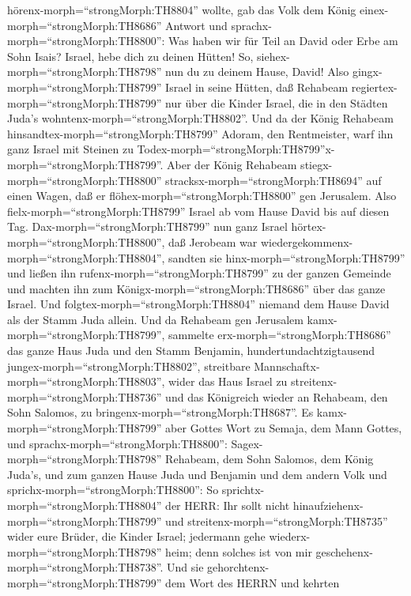 hörenx-morph=``strongMorph:TH8804'' wollte, gab das Volk dem König
einex-morph=``strongMorph:TH8686'' Antwort und
sprachx-morph=``strongMorph:TH8800'': Was haben wir für Teil an David
oder Erbe am Sohn Isais? Israel, hebe dich zu deinen Hütten! So,
siehex-morph=``strongMorph:TH8798'' nun du zu deinem Hause, David! Also
gingx-morph=``strongMorph:TH8799'' Israel in seine Hütten, 
daß Rehabeam regiertex-morph=``strongMorph:TH8799'' nur über die Kinder
Israel, die in den Städten Juda's wohntenx-morph=``strongMorph:TH8802''.
 Und da der König Rehabeam
hinsandtex-morph=``strongMorph:TH8799'' Adoram, den Rentmeister, warf
ihn ganz Israel mit Steinen zu
Todex-morph=``strongMorph:TH8799''x-morph=``strongMorph:TH8799''. Aber
der König Rehabeam stiegx-morph=``strongMorph:TH8800''
stracksx-morph=``strongMorph:TH8694'' auf einen Wagen, daß er
flöhex-morph=``strongMorph:TH8800'' gen Jerusalem.  Also
fielx-morph=``strongMorph:TH8799'' Israel ab vom Hause David bis auf
diesen Tag.  Dax-morph=``strongMorph:TH8799'' nun ganz
Israel hörtex-morph=``strongMorph:TH8800'', daß Jerobeam war
wiedergekommenx-morph=``strongMorph:TH8804'', sandten sie
hinx-morph=``strongMorph:TH8799'' und ließen ihn
rufenx-morph=``strongMorph:TH8799'' zu der ganzen Gemeinde und machten
ihn zum Königx-morph=``strongMorph:TH8686'' über das ganze Israel. Und
folgtex-morph=``strongMorph:TH8804'' niemand dem Hause David als der
Stamm Juda allein.  Und da Rehabeam gen Jerusalem
kamx-morph=``strongMorph:TH8799'', sammelte
erx-morph=``strongMorph:TH8686'' das ganze Haus Juda und den Stamm
Benjamin, hundertundachtzigtausend jungex-morph=``strongMorph:TH8802'',
streitbare Mannschaftx-morph=``strongMorph:TH8803'', wider das Haus
Israel zu streitenx-morph=``strongMorph:TH8736'' und das Königreich
wieder an Rehabeam, den Sohn Salomos, zu
bringenx-morph=``strongMorph:TH8687''.  Es
kamx-morph=``strongMorph:TH8799'' aber Gottes Wort zu Semaja, dem Mann
Gottes, und sprachx-morph=``strongMorph:TH8800'': 
Sagex-morph=``strongMorph:TH8798'' Rehabeam, dem Sohn Salomos, dem König
Juda's, und zum ganzen Hause Juda und Benjamin und dem andern Volk und
sprichx-morph=``strongMorph:TH8800'':  So
sprichtx-morph=``strongMorph:TH8804'' der HERR: Ihr sollt nicht
hinaufziehenx-morph=``strongMorph:TH8799'' und
streitenx-morph=``strongMorph:TH8735'' wider eure Brüder, die Kinder
Israel; jedermann gehe wiederx-morph=``strongMorph:TH8798'' heim; denn
solches ist von mir geschehenx-morph=``strongMorph:TH8738''. Und sie
gehorchtenx-morph=``strongMorph:TH8799'' dem Wort des HERRN und kehrten
